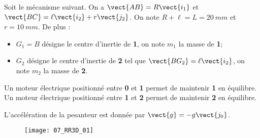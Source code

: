 \normalfalse \difficiletrue \tdifficilefalse
\correctionfalse


\setcounter{question}{0}%
\ifcorrection
\else
{}
\fi

\ifprof
\else
Soit le mécanisme suivant. On a $\vect{AB}=R\vect{i_1}$ et $\vect{BC}=\ell\vect{i_2}+r\vect{j_2}$. On note $R+\ell=L = \SI{20}{mm}$ et $r=\SI{10}{mm}$. De plus :
\begin{itemize}
\item $G_1=B$ désigne le centre d'inertie de \textbf{1}, on note $m_1$ la masse de \textbf{1};%
\item $G_2$ désigne le centre d'inertie de \textbf{2} tel que  $\vect{BG_2}=\ell\vect{i_2}$, on note $m_2$ la masse de \textbf{2}.%
\end{itemize}

Un moteur électrique positionné entre \textbf{0} et \textbf{1} permet de maintenir \textbf{1} en équilibre.
Un moteur électrique positionné entre \textbf{1} et \textbf{2} permet de maintenir \textbf{2} en équilibre.

L'accélération de la pesanteur est donnée par $\vect{g}=-g\vect{j_0}$.

\begin{figure}[!h]
\texttt{[image: 07\_RR3D\_01]}
\end{figure}
\fi

\ifprof
\else
\fi

\ifprof
\else
\fi

\ifprof
\else
\fi

\ifprof
\else


\fi